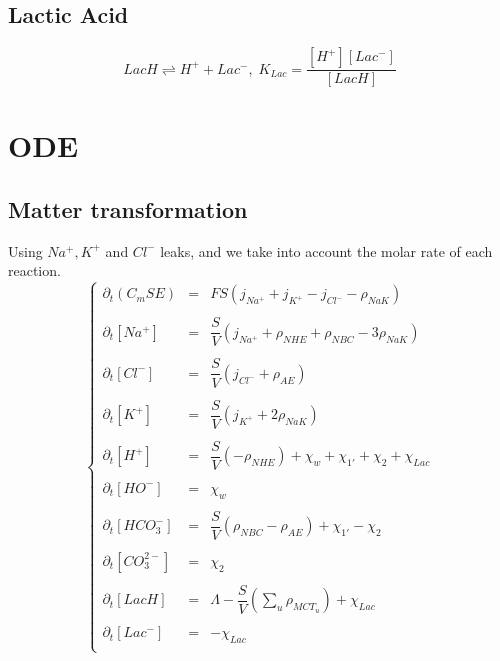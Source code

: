 \documentclass{revtex4}
\begin{document}
\subsection{Lactic Acid}
\begin{equation}
	LacH \rightleftharpoons H^+ + Lac^-, \; K_{Lac} = \dfrac{\left[H^+\right]\left[Lac^-\right]}{\left[LacH\right]}
\end{equation}

\section{ODE}
\subsection{Matter transformation}
Using $Na^+,K^+$ and $Cl^-$ leaks, and we take into account the molar rate of each reaction.	
\begin{equation}
\left\lbrace
\begin{array}{rcl}
	\partial_t \left(C_m S E \right) & = & FS\left(j_{Na^+}+j_{K^+}-j_{Cl^-} - \rho_{NaK}\right) \\
	\\
	\partial_t \left[Na^+\right] & = & \dfrac{S}{V}\left(j_{Na^+}+\rho_{NHE}+\rho_{NBC}-3\rho_{NaK}\right) \\
	\\
	\partial_t \left[Cl^-\right] & = & \dfrac{S}{V}\left(j_{Cl^-} + \rho_{AE}\right)\\
	\\
	\partial_t \left[K^+\right]  & = & \dfrac{S}{V}\left(j_{K^+}+2\rho_{NaK}\right)\\
	\\
	\partial_t \left[H^+\right]  & = & \dfrac{S}{V}\left(-\rho_{NHE}\right) + \chi_{w} + \chi_{1'} + \chi_2 + \chi_{Lac}\\
	\\
	\partial_t \left[HO^-\right] & = & \chi_{w}\\
	\\
	\partial_t \left[HCO_3^-\right] & = & \dfrac{S}{V}\left(\rho_{NBC}-\rho_{AE}\right) + \chi_{1'} - \chi_2 \\
	\\
	\partial_t \left[CO_3^{2-}\right] & = & \chi_2\\
	\\
	\partial_t \left[LacH\right]      & = & \Lambda - \dfrac{S}{V}\left(\sum_u\rho_{MCT_u}\right) + \chi_{Lac}\\
	\\
	\partial_t \left[Lac^-\right]     & = & - \chi_{Lac}\\
	
\end{array}
\right.
\end{equation}
\end{document}
